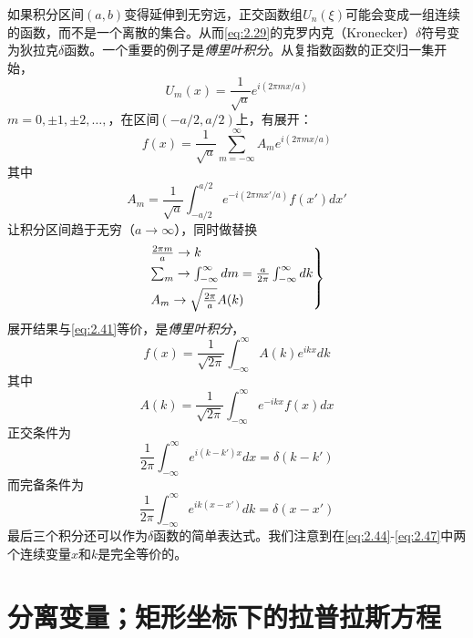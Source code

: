 \documentclass[12pt]{book}
\numberwithin{equation}{chapter}
\numberwithin{figure}{chapter}
\numberwithin{footnote}{page}
\begin{document}
如果积分区间$(a,b)$变得延伸到无穷远，正交函数组$U_n(\xi)$可能会变成一组连续的函数，而不是一个离散的集合。从而\autoref{eq:2.29}的克罗内克（Kronecker）$\delta$符号变为狄拉克$\delta$函数。一个重要的例子是\textit{傅里叶积分}。从复指数函数的正交归一集开始，
\begin{equation}\label{eq:2.40}
    U_m(x)=\frac{1}{\sqrt{a}}e^{i(2\pi mx/a)}
\end{equation}
$m=0,\pm1,\pm2,\dots,$，在区间$(-a/2,a/2)$上，有展开：
\begin{equation}\label{eq:2.41}
    f(x)=\frac{1}{\sqrt{a}}\sum_{m=-\infty}^{\infty}A_m e^{i(2\pi mx/a)}
\end{equation}
其中
\begin{equation}\label{eq:2.42}
    A_m=\frac{1}{\sqrt{a}}\int_{-a/2}^{a/2} e^{-i(2\pi mx'/a)}f(x')dx'
\end{equation}
让积分区间趋于无穷（$a\to\infty$），同时做替换
\begin{equation}\label{eq:2.43}
    \begin{rcases*}
    \frac{2\pi m}{a}\to k\\
    \sum_m\to\int_{-\infty}^\infty dm=\frac{a}{2\pi}\int_{-\infty}^\infty dk\\
    A_m\to \sqrt{\frac{2\pi}{a}}A(k)\\
    \end{rcases*}
\end{equation}
展开结果与\autoref{eq:2.41}等价，是\textit{傅里叶积分}，
\begin{equation}\label{eq:2.44}
    f(x)=\frac{1}{\sqrt{2\pi}}\int_{-\infty}^\infty A(k)e^{ikx}dk
\end{equation}
其中
\begin{equation}\label{eq:2.45}
    A(k)=\frac{1}{\sqrt{2\pi}}\int_{-\infty}^\infty e^{-ikx}f(x)dx
\end{equation}
正交条件为
\begin{equation}\label{eq:2.46}
    \frac{1}{2\pi}\int_{-\infty}^\infty e^{i(k-k')x}dx=\delta(k-k')
\end{equation}
而完备条件为
\begin{equation}\label{eq:2.47}
    \frac{1}{2\pi}\int_{-\infty}^\infty e^{ik(x-x')}dk=\delta(x-x')
\end{equation}
最后三个积分还可以作为$\delta$函数的简单表达式。我们注意到在\autoref{eq:2.44}-\autoref{eq:2.47}中两个连续变量$x$和$k$是完全等价的。

\section{分离变量；矩形坐标下的拉普拉斯方程}\label{sec:2.9}
\end{document}
